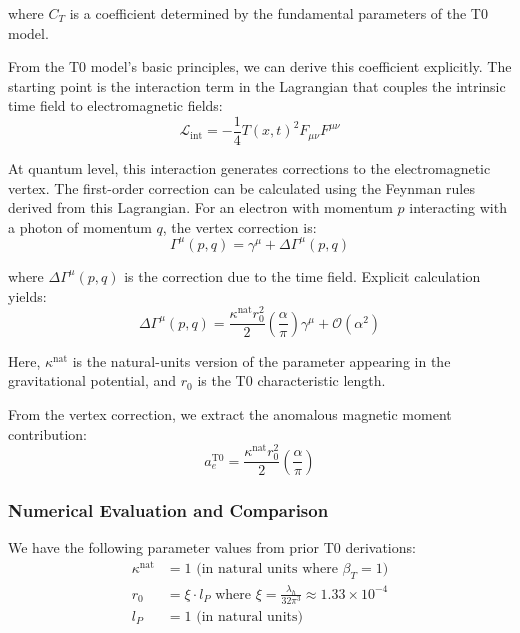 \documentclass[12pt,a4paper]{article}
\newcommand{\Tfieldt}{T(x,t)}
\begin{document}
	where $C_T$ is a coefficient determined by the fundamental parameters of the T0 model.
	
	From the T0 model's basic principles, we can derive this coefficient explicitly. The starting point is the interaction term in the Lagrangian that couples the intrinsic time field to electromagnetic fields:
	\begin{equation}
		\mathcal{L}_{\text{int}} = -\frac{1}{4}\Tfieldt^2 F_{\mu\nu}F^{\mu\nu}
	\end{equation}
	
	At quantum level, this interaction generates corrections to the electromagnetic vertex. The first-order correction can be calculated using the Feynman rules derived from this Lagrangian. For an electron with momentum $p$ interacting with a photon of momentum $q$, the vertex correction is:
	\begin{equation}
		\Gamma^{\mu}(p,q) = \gamma^{\mu} + \Delta\Gamma^{\mu}(p,q)
	\end{equation}
	
	where $\Delta\Gamma^{\mu}(p,q)$ is the correction due to the time field. Explicit calculation yields:
	\begin{equation}
		\Delta\Gamma^{\mu}(p,q) = \frac{\kappa^{\text{nat}}r_0^2}{2}\left(\frac{\alpha}{\pi}\right)\gamma^{\mu} + \mathcal{O}(\alpha^2)
	\end{equation}
	
	Here, $\kappa^{\text{nat}}$ is the natural-units version of the parameter appearing in the gravitational potential, and $r_0$ is the T0 characteristic length.
	
	From the vertex correction, we extract the anomalous magnetic moment contribution:
	\begin{equation}
		a_e^{\text{T0}} = \frac{\kappa^{\text{nat}}r_0^2}{2}\left(\frac{\alpha}{\pi}\right)
	\end{equation}
	
	\subsubsection{Numerical Evaluation and Comparison}
	
	We have the following parameter values from prior T0 derivations:
	\begin{align}
		\kappa^{\text{nat}} &= 1 \text{ (in natural units where $\beta_T = 1$)} \\
		r_0 &= \xi \cdot l_P \text{ where } \xi = \frac{\lambda_h}{32\pi^3} \approx 1.33 \times 10^{-4} \\
		l_P &= 1 \text{ (in natural units)}
	\end{align}
	
\end{document}
